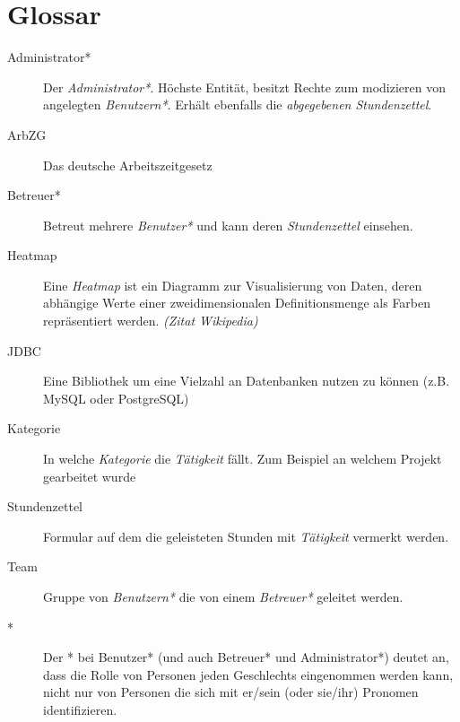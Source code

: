 \section{Glossar}
\begin{description}
	\item[Administrator*] Der \emph{Administrator*}. Höchste Entität, besitzt Rechte zum modizieren von angelegten \emph{Benutzern*}.
	               Erhält ebenfalls die \emph{abgegebenen Stundenzettel}.

	\item[ArbZG] Das deutsche Arbeitszeitgesetz

	\item[Betreuer*] Betreut mehrere \emph{Benutzer*} und kann deren \emph{Stundenzettel} einsehen.

	\item[Heatmap] Eine \emph{Heatmap} ist ein Diagramm zur Visualisierung von Daten, deren abhängige Werte einer zweidimensionalen Definitionsmenge als Farben repräsentiert werden.  \emph{(Zitat Wikipedia)}

	\item[JDBC] Eine Bibliothek um eine Vielzahl an Datenbanken nutzen zu können (z.B. MySQL oder PostgreSQL)

	\item[Kategorie] In welche \emph{Kategorie} die \emph{Tätigkeit} fällt. Zum Beispiel an welchem Projekt gearbeitet wurde

	\item[Stundenzettel] Formular auf dem die geleisteten Stunden mit \emph{Tätigkeit} vermerkt werden.

	\item[Team] Gruppe von \emph{Benutzern*} die von einem \emph{Betreuer*} geleitet werden.
	\item[*] Der * bei Benutzer* (und auch Betreuer* und Administrator*) deutet an, dass die Rolle von Personen jeden Geschlechts eingenommen werden kann, nicht nur von Personen die sich mit er/sein (oder sie/ihr) Pronomen identifizieren.

\end{description}
